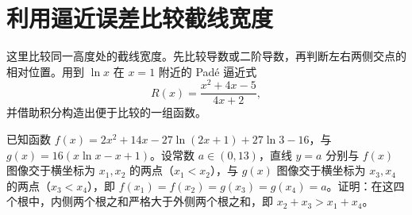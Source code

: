 \section{利用逼近误差比较截线宽度}

这里比较同一高度处的截线宽度。先比较导数或二阶导数，再判断左右两侧交点的相对位置。用到 $\ln x$ 在 $x=1$ 附近的 Pad\'e 逼近式
\[
R(x) = \frac{x^2+4x-5}{4x+2},
\]
并借助积分构造出便于比较的一组函数。

\begin{example}
已知函数 $f(x) = 2x^2 + 14x - 27\ln(2x+1) + 27\ln 3 - 16$，与 $g(x) = 16(x\ln x - x + 1)$。设常数 $a \in (0, 13)$，直线 $y=a$ 分别与 $f(x)$ 图像交于横坐标为 $x_1, x_2$ 的两点（$x_1 < x_2$），与 $g(x)$ 图像交于横坐标为 $x_3, x_4$ 的两点（$x_3 < x_4$），即 $f(x_1) = f(x_2) = g(x_3) = g(x_4) = a$。证明：在这四个根中，内侧两个根之和严格大于外侧两个根之和，即 $x_2 + x_3 > x_1 + x_4$。
\end{example}

